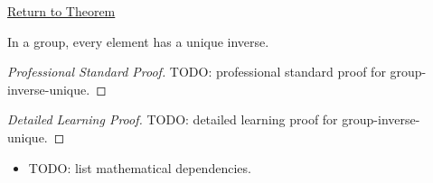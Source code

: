 \newpage
{}
\label{prf:group-inverse-unique}

\begin{remark*}[Return]
\hyperref[prop:group-inverse-unique]{Return to Theorem}
\end{remark*}

\begin{theorem*}
In a group, every element has a unique inverse.
\end{theorem*}

\begin{proof}[Professional Standard Proof]
\LRAProofBodyStart
TODO: professional standard proof for group-inverse-unique.
\end{proof}

\begin{proof}[Detailed Learning Proof]
\LRAProofBodyStart
TODO: detailed learning proof for group-inverse-unique.
\end{proof}

\begin{remark*}
\end{remark*}

\begin{dependencies}
\begin{itemize}
  \item TODO: list mathematical dependencies.
\end{itemize}
\end{dependencies}

\clearpage
